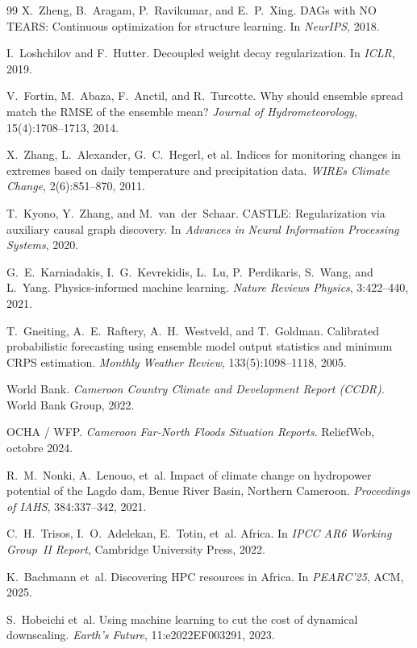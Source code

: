 \begin{thebibliography}{99}
 X.~Zheng, B.~Aragam, P.~Ravikumar, and E.~P.~Xing. DAGs with NO TEARS: Continuous optimization for structure learning. In \emph{NeurIPS}, 2018.

 I.~Loshchilov and F.~Hutter. Decoupled weight decay regularization. In \emph{ICLR}, 2019.

 V.~Fortin, M.~Abaza, F.~Anctil, and R.~Turcotte. Why should ensemble spread match the RMSE of the ensemble mean? \emph{Journal of Hydrometeorology}, 15(4):1708--1713, 2014.

 X.~Zhang, L.~Alexander, G.~C.~Hegerl, et al. Indices for monitoring changes in extremes based on daily temperature and precipitation data. \emph{WIREs Climate Change}, 2(6):851--870, 2011.

 T.~Kyono, Y.~Zhang, and M.~van~der~Schaar. CASTLE: Regularization via auxiliary causal graph discovery. In \emph{Advances in Neural Information Processing Systems}, 2020.

 G.~E.~Karniadakis, I.~G.~Kevrekidis, L.~Lu, P.~Perdikaris, S.~Wang, and L.~Yang. Physics-informed machine learning. \emph{Nature Reviews Physics}, 3:422--440, 2021.

 T.~Gneiting, A.~E.~Raftery, A.~H.~Westveld, and T.~Goldman. Calibrated probabilistic forecasting using ensemble model output statistics and minimum CRPS estimation. \emph{Monthly Weather Review}, 133(5):1098--1118, 2005.

 World Bank. \emph{Cameroon Country Climate and Development Report (CCDR)}. World Bank Group, 2022.

 OCHA / WFP. \emph{Cameroon Far-North Floods Situation Reports}. ReliefWeb, octobre 2024.

 R.~M.~Nonki, A.~Lenouo, et~al. Impact of climate change on hydropower potential of the Lagdo dam, Benue River Basin, Northern Cameroon. \emph{Proceedings of IAHS}, 384:337--342, 2021.

 C.~H.~Trisos, I.~O.~Adelekan, E.~Totin, et~al. Africa. In \emph{IPCC AR6 Working Group~II Report}, Cambridge University Press, 2022.

 K.~Bachmann et~al. Discovering HPC resources in Africa. In \emph{PEARC'25}, ACM, 2025.

 S.~Hobeichi et~al. Using machine learning to cut the cost of dynamical downscaling. \emph{Earth's Future}, 11:e2022EF003291, 2023.


\end{thebibliography}
